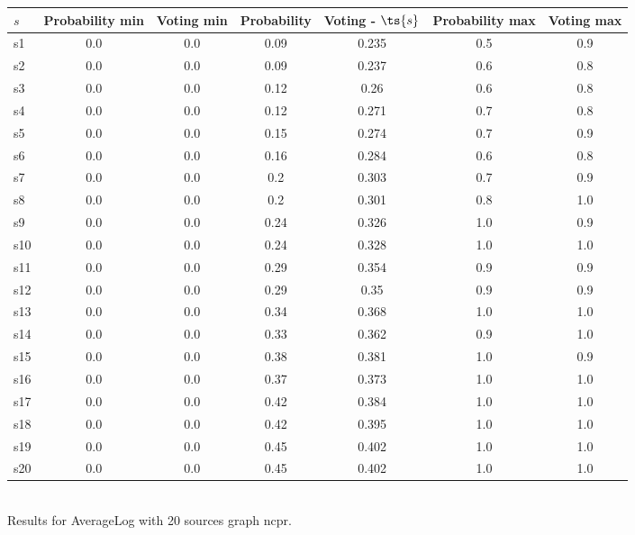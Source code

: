 \documentclass{article}
\begin{document}
\noindent\begin{tabular}{|l|c|c|c|c|c|c|}
\hline
$s$& Probability min & Voting min & Probability & Voting - $\ts{s}$ & Probability max & Voting max\\
\hline
s1 &0.0 & 0.0 & 0.09 & 0.235 & 0.5 & 0.9\\
\hline
s2 &0.0 & 0.0 & 0.09 & 0.237 & 0.6 & 0.8\\
\hline
s3 &0.0 & 0.0 & 0.12 & 0.26 & 0.6 & 0.8\\
\hline
s4 &0.0 & 0.0 & 0.12 & 0.271 & 0.7 & 0.8\\
\hline
s5 &0.0 & 0.0 & 0.15 & 0.274 & 0.7 & 0.9\\
\hline
s6 &0.0 & 0.0 & 0.16 & 0.284 & 0.6 & 0.8\\
\hline
s7 &0.0 & 0.0 & 0.2 & 0.303 & 0.7 & 0.9\\
\hline
s8 &0.0 & 0.0 & 0.2 & 0.301 & 0.8 & 1.0\\
\hline
s9 &0.0 & 0.0 & 0.24 & 0.326 & 1.0 & 0.9\\
\hline
s10 &0.0 & 0.0 & 0.24 & 0.328 & 1.0 & 1.0\\
\hline
s11 &0.0 & 0.0 & 0.29 & 0.354 & 0.9 & 0.9\\
\hline
s12 &0.0 & 0.0 & 0.29 & 0.35 & 0.9 & 0.9\\
\hline
s13 &0.0 & 0.0 & 0.34 & 0.368 & 1.0 & 1.0\\
\hline
s14 &0.0 & 0.0 & 0.33 & 0.362 & 0.9 & 1.0\\
\hline
s15 &0.0 & 0.0 & 0.38 & 0.381 & 1.0 & 0.9\\
\hline
s16 &0.0 & 0.0 & 0.37 & 0.373 & 1.0 & 1.0\\
\hline
s17 &0.0 & 0.0 & 0.42 & 0.384 & 1.0 & 1.0\\
\hline
s18 &0.0 & 0.0 & 0.42 & 0.395 & 1.0 & 1.0\\
\hline
s19 &0.0 & 0.0 & 0.45 & 0.402 & 1.0 & 1.0\\
\hline
s20 &0.0 & 0.0 & 0.45 & 0.402 & 1.0 & 1.0\\
\hline
\end{tabular}\\

\noindent Results for AverageLog with 20 sources graph ncpr.
\end{document}
